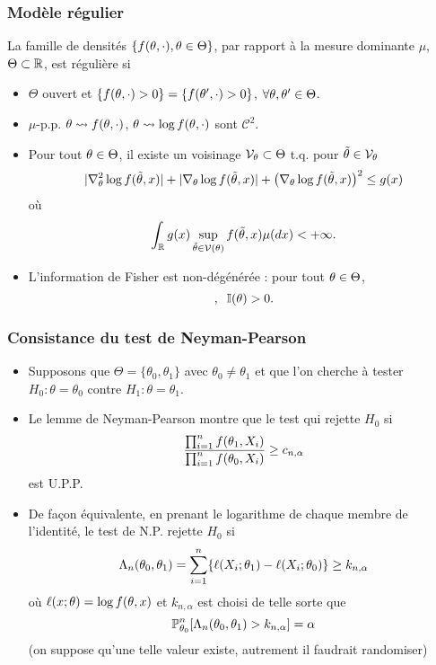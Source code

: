 \begin{frame}
\frametitle{Modèle régulier}
\begin{df} La famille de densités $\{f(\theta,\cdot),\theta \in \Theta\}$,  par rapport à la mesure dominante $\mu$, $\Theta \subset \operatorname{{\mathbb R}}$, est \alert{régulière} si
\begin{itemize}
\item $\Theta$ ouvert et $\{f(\theta, \cdot)>0\}=\{f(\theta', \cdot)>0\}$, $\forall \theta, \theta' \in \Theta$.
\item $\mu$-p.p. $\theta \leadsto f(\theta,\cdot)$, $\theta \leadsto \log f(\theta,\cdot)$ sont ${\mathcal C}^2$.
 \item Pour tout $\theta \in \Theta$, il existe un voisinage ${\mathcal V}_\theta \subset \Theta$ t.q. pour $\tilde{\theta} \in {\mathcal V}_\theta$
$$|\nabla_\theta^{2}\log f(\tilde{\theta},x)|+|\nabla_\theta \log f(\tilde{\theta},x)|+\big(\nabla_\theta\log f(\tilde{\theta},x)\big)^2\leq g(x)$$
où
$$\int_{\mathbb{R}}g(x)\sup_{\tilde{\theta} \in {\mathcal V}(\theta)}f(\tilde{\theta},x)\mu(dx)<+\infty.$$
\item L'information de Fisher est non-dégénérée : pour tout $\theta \in \Theta$,
$$,\;\;\mathbb{I}(\theta) >0.$$
\end{itemize}
\end{df}
\end{frame}

\begin{frame}
\frametitle{Consistance du test de Neyman-Pearson}
\begin{itemize}
\item Supposons que $\Theta= \{\theta_0,\theta_1\}$ avec $\theta_0 \ne \theta_1$ et que l'on cherche à tester $H_0: \theta = \theta_0$ contre $H_1: \theta= \theta_1$.
\item Le lemme de Neyman-Pearson montre que le test qui rejette $H_0$ si
\[
\frac{\prod_{i=1}^n f(\theta_1,X_i)}{\prod_{i=1}^{n} f(\theta_0,X_i)} \geq c_{n,\alpha}
\]
est U.P.P.
\item De façon équivalente, en prenant le logarithme de chaque membre de l'identité, le test de N.P. rejette $H_0$ si
\[
\Lambda_n(\theta_0,\theta_1) = \sum_{i=1}^n \{ \ell(X_i; \theta_1) - \ell(X_i; \theta_0) \} \geq k_{n,\alpha}
\]
où $\ell(x;\theta)= \log f(\theta,x)$ et $k_{n,\alpha}$ est choisi de telle sorte que
\[
\operatorname{{\mathbb P}}_{\theta_0}^n [ \Lambda_n(\theta_0,\theta_1)  > k_{n,\alpha}] = \alpha
\]
(on suppose qu'une telle valeur existe, autrement il faudrait randomiser)
\end{itemize}
\end{frame}

